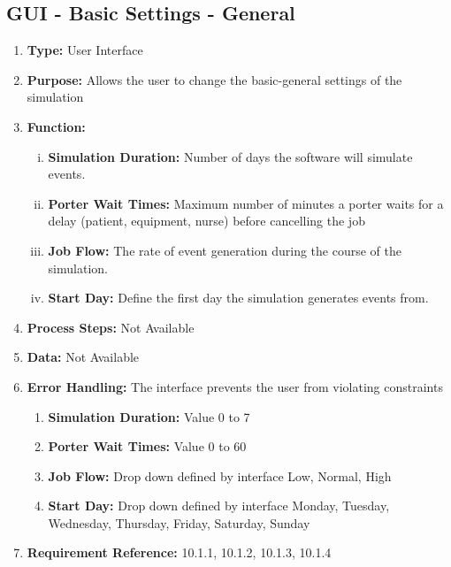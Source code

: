\documentclass[paper=letter, fontsize=10pt]{scrartcl}
\numberwithin{equation}{section}		%
\numberwithin{figure}{section}			%
\numberwithin{table}{section}				%
\begin{document}
\subsection{GUI - Basic Settings - General}
\begin{enumerate}[]
	\item \textbf{Type:} User Interface
	\item \textbf{Purpose:} Allows the user to change the basic-general settings of the simulation
	\item \textbf{Function:} 
	\begin{enumerate}[(i)]
		\item \textbf{Simulation Duration:} Number of days the software will simulate events.
		\item \textbf{Porter Wait Times:} Maximum number of minutes a porter waits for a delay (patient, equipment, nurse) before cancelling the job
		\item \textbf{Job Flow:} The rate of event generation during the course of the simulation.
		\item \textbf{Start Day:} Define the first day the simulation generates events from.
	\end{enumerate}
	\item \textbf{Process Steps:} Not Available
	\item \textbf{Data:} Not Available
	\item \textbf{Error Handling:} The interface prevents the user from violating constraints
	\begin{enumerate}[]
		\item \textbf{Simulation Duration:} Value 0 to 7 
		\item \textbf{Porter Wait Times:} Value 0 to 60
		\item \textbf{Job Flow:} Drop down defined by interface {Low, Normal, High}
		\item \textbf{Start Day:} Drop down defined by interface {Monday, Tuesday, Wednesday, Thursday, Friday, Saturday, Sunday}   
	\end{enumerate}
	\item \textbf{Requirement Reference:} 10.1.1, 10.1.2, 10.1.3, 10.1.4
\end{enumerate}
\end{document}
